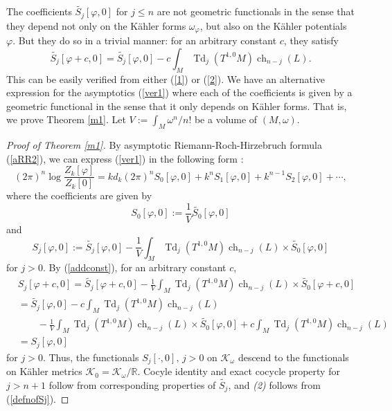 \documentclass[12pt,reqno,a4paper]{amsart}
\numberwithin{equation}{section}
\DeclareMathOperator{\Td}{Td}
\DeclareMathOperator{\ch}{ch}
\theoremstyle{remark}
\theoremstyle{dotless}
\begin{document}
The coefficients $\widetilde{S_j}[\varphi,0]$ for $j\leq n$ are not geometric
functionals in the sense that they depend not only on the K\"ahler forms $\omega_\varphi$, but also on the K\"ahler potentials $\varphi$. But they do so in a trivial manner: for an arbitrary constant $c$, they satisfy
\begin{equation}\label{addconst}
\widetilde{S_j}[\varphi+c,0]=\widetilde{S_j}[\varphi,0]-c\int_M \Td_j(T^{1,0}M)\ch_{n-j}(L).
\end{equation}
This can be easily verified from either (\ref{1}) or (\ref{2}). We have an alternative expression for the asymptotics (\ref{ver1}) where each of the coefficients is given by a geometric functional in the sense that it only depends on K\"ahler forms. That is, we prove Theorem \ref{m1}. Let $V:=\int_M \omega^n/n!$ be a volume of $(M,\omega)$.

\begin{proof}[Proof of Theorem \ref{m1}]
By asymptotic Riemann-Roch-Hirzebruch formula (\ref{aRR2}), we can express (\ref{ver1}) in the following form :
\begin{equation*}
(2\pi)^n\log \frac{Z_k[\varphi]}{Z_k[0]}=kd_{k}(2\pi)^nS_0[\varphi,0]+k^{n}S_1[\varphi,0]+k^{n-1}S_2[\varphi,0]+\cdots,
\end{equation*}
where the coefficients are given by
\begin{equation*}
S_0[\varphi,0]:=\frac{1}{V}\widetilde{S_0}[\varphi,0]
\end{equation*}
and
\begin{equation}\label{defnofSj}
S_j[\varphi,0]:=\widetilde{S_j}[\varphi,0]-\frac{1}{V}\int_M \Td_j(T^{1,0}M)\ch_{n-j}(L) \times\widetilde{S_0}[\varphi,0]
\end{equation}
for $j>0$. By (\ref{addconst}), for an arbitrary constant $c$,
\begin{align*}
&S_j[\varphi+c,0]=\widetilde{S_j}[\varphi+c,0]-\frac{1}{V}\int_M \Td_j(T^{1,0}M)\ch_{n-j}(L) \times\widetilde{S_0}[\varphi+c,0]\\
&=\widetilde{S_j}[\varphi,0]-c\int_M \Td_j(T^{1,0}M)\ch_{n-j}(L)\nonumber\\
&\qquad-\frac{1}{V}\int_M \Td_j(T^{1,0}M)\ch_{n-j}(L) \times\widetilde{S_0}[\varphi,0]+c\int_M \Td_j(T^{1,0}M)\ch_{n-j}(L)\\
&=S_j[\varphi,0]
\end{align*}
for $j>0$. Thus, the functionals $S_j[\cdot,0],\, j>0$ on $\mathcal{K}_\omega$ descend to the functionals on K\"ahler metrics $\mathcal{K}_0=\mathcal{K}_\omega/\mathbb{R}$. Cocyle identity and exact cocycle property for $j>n+1$ follow from corresponding properties of $\widetilde{S_j}$, and \textit{(2)} follows from (\ref{defnofSj}).
\end{proof}
\end{document}
